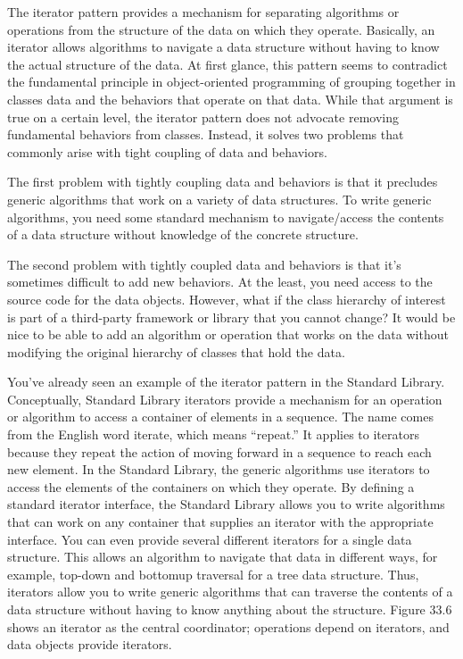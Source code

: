 The iterator pattern provides a mechanism for separating algorithms or operations from the structure of the data on which they operate. Basically, an iterator allows algorithms to navigate a data structure without having to know the actual structure of the data. At first glance, this pattern seems to contradict the fundamental principle in object-oriented programming of grouping together in classes data and the behaviors that operate on that data. While that argument is true on a certain level, the iterator pattern does not advocate removing fundamental behaviors from classes. Instead, it solves two problems that commonly arise with tight coupling of data and behaviors.

The first problem with tightly coupling data and behaviors is that it precludes generic algorithms that work on a variety of data structures. To write generic algorithms, you need some standard mechanism to navigate/access the contents of a data structure without knowledge of the concrete structure.

The second problem with tightly coupled data and behaviors is that it’s sometimes difficult to add new behaviors. At the least, you need access to the source code for the data objects. However, what if the class hierarchy of interest is part of a third-party framework or library that you cannot change? It would be nice to be able to add an algorithm or operation that works on the data without modifying the original hierarchy of classes that hold the data.

You’ve already seen an example of the iterator pattern in the Standard Library. Conceptually, Standard Library iterators provide a mechanism for an operation or algorithm to access a container of elements in a sequence. The name comes from the English word iterate, which means “repeat.” It applies to iterators because they repeat the action of moving forward in a sequence to reach each new element. In the Standard Library, the generic algorithms use iterators to access the elements of the containers on which they operate. By defining a standard iterator interface, the Standard Library allows you to write algorithms that can work on any container that supplies an iterator with the appropriate interface. You can even provide several different iterators for a single data structure. This allows an algorithm to navigate that data in different ways, for example, top-down and bottomup traversal for a tree data structure. Thus, iterators allow you to write generic algorithms that can traverse the contents of a data structure without having to know anything about the structure. Figure 33.6 shows an iterator as the central coordinator; operations depend on iterators, and data objects provide iterators.

